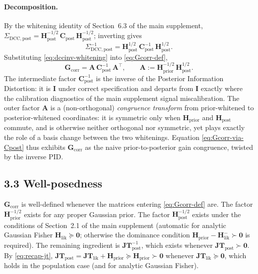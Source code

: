 \documentclass[11pt]{article}
\begin{document}
\paragraph{Decomposition.}
By the whitening identity of Section~6.3 of the main supplement, $\Sigma_{\mathrm{DCC},\mathrm{post}} = \mathbf H_{\mathrm{post}}^{-1/2}\, \mathbf C_{\mathrm{post}}\, \mathbf H_{\mathrm{post}}^{-1/2}$; inverting gives
\begin{equation}
\Sigma_{\mathrm{DCC},\mathrm{post}}^{-1} = \mathbf H_{\mathrm{post}}^{1/2}\, \mathbf C_{\mathrm{post}}^{-1}\, \mathbf H_{\mathrm{post}}^{1/2}.
\label{eq:dccinv-whitening}
\end{equation}
Substituting \eqref{eq:dccinv-whitening} into \eqref{eq:Gcorr-def},
\begin{equation}
\mathbf G_{\mathrm{corr}}
=
\mathbf A\, \mathbf C_{\mathrm{post}}^{-1}\, \mathbf A^{\top},
\qquad
\mathbf A := \mathbf H_{\mathrm{prior}}^{-1/2}\, \mathbf H_{\mathrm{post}}^{1/2}.
\label{eq:Gcorr-via-Cpost}
\end{equation}
The intermediate factor $\mathbf C_{\mathrm{post}}^{-1}$ is the inverse of the Posterior Information Distortion: it is $\mathbf I$ under correct specification and departs from $\mathbf I$ exactly where the calibration diagnostics of the main supplement signal miscalibration. The outer factor $\mathbf A$ is a (non-orthogonal) \emph{congruence transform} from prior-whitened to posterior-whitened coordinates: it is symmetric only when $\mathbf H_{\mathrm{prior}}$ and $\mathbf H_{\mathrm{post}}$ commute, and is otherwise neither orthogonal nor symmetric, yet plays exactly the role of a basis change between the two whitenings. Equation \eqref{eq:Gcorr-via-Cpost} thus exhibits $\mathbf G_{\mathrm{corr}}$ as the naive prior-to-posterior gain congruence, twisted by the inverse PID.

\subsection*{3.3 Well-posedness}

$\mathbf G_{\mathrm{corr}}$ is well-defined whenever the matrices entering \eqref{eq:Gcorr-def} are. The factor $\mathbf H_{\mathrm{prior}}^{-1/2}$ exists for any proper Gaussian prior. The factor $\mathbf H_{\mathrm{post}}^{-1/2}$ exists under the conditions of Section~2.1 of the main supplement (automatic for analytic Gaussian Fisher $\mathbf H_{\mathrm{lik}} \succeq \mathbf 0$; otherwise the dominance condition $\mathbf H_{\mathrm{prior}} - \mathbf H_{\mathrm{lik}}^- \succ \mathbf 0$ is required). The remaining ingredient is $\mathbf{JT}_{\mathrm{post}}^{-1}$, which exists whenever $\mathbf{JT}_{\mathrm{post}} \succ \mathbf 0$. By \eqref{eq:recap-jt}, $\mathbf{JT}_{\mathrm{post}} = \mathbf{JT}_{\mathrm{lik}} + \mathbf H_{\mathrm{prior}} \succeq \mathbf H_{\mathrm{prior}} \succ \mathbf 0$ whenever $\mathbf{JT}_{\mathrm{lik}} \succeq \mathbf 0$, which holds in the population case (and for analytic Gaussian Fisher).
\end{document}
